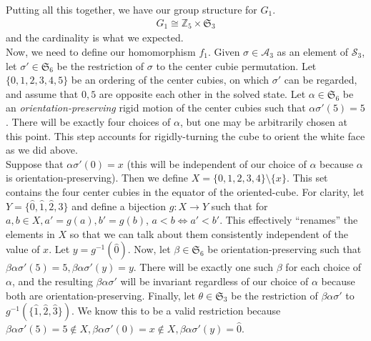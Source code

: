 \documentclass[10pt,letterpaper]{report}
\begin{document}
Putting all this together, we have our group structure for $G_1$. \begin{align*}
G_1 \cong \mathbb{Z}_5 \times \mathfrak{S}_3
\end{align*}
and the cardinality is what we expected.   \\

Now, we need to define our homomorphism $f_1$.  Given $\sigma \in \mathcal{A}_3$ as an element of $\mathcal{S}_3$, let $\sigma' \in \mathfrak{S}_6$ be the restriction of $\sigma$ to the center cubie permutation.  Let $\{0,1,2,3,4,5\}$ be an ordering of the center cubies, on which $\sigma'$ can be regarded, and assume that $0,5$ are opposite each other in the solved state.  Let $\alpha \in \mathfrak{S}_6$ be an \textit{orientation-preserving} rigid motion of the center cubies such that $\alpha \sigma' (5) = 5$.  There will be exactly four choices of $\alpha$, but one may be arbitrarily chosen at this point.  This step accounts for rigidly-turning the cube to orient the white face as we did above. \\

Suppose that $\alpha \sigma' (0) = x$ (this will be independent of our choice of $\alpha$ because $\alpha$ is orientation-preserving).  Then we define $X = \{0,1,2,3,4\} \setminus \{x\}$.  This set contains the four center cubies in the equator of the oriented-cube.  For clarity, let $Y = \{\hat{0},\hat{1},\hat{2},\hat{3}\}$ and define a bijection $g : X \rightarrow Y$ such that for $a,b \in X, a' = g(a), b' = g(b)$, $a < b \Leftrightarrow a' < b'$.  This effectively ``renames'' the elements in $X$ so that we can talk about them consistently independent of the value of $x$.  Let $y = g^{-1}(\hat{0})$.  Now, let $\beta \in \mathfrak{S}_6$ be orientation-preserving such that $\beta \alpha \sigma' (5) = 5, \beta \alpha \sigma' (y) = y$.  There will be exactly one such $\beta$ for each choice of $\alpha$, and the resulting $\beta \alpha \sigma'$ will be invariant regardless of our choice of $\alpha$ because both are orientation-preserving.  Finally, let $\theta \in \mathfrak{S}_3$ be the restriction of $\beta \alpha \sigma'$ to $g^{-1}(\{\hat{1}, \hat{2}, \hat{3}\})$.  We know this to be a valid restriction because $\beta \alpha \sigma' (5) = 5 \notin X, \beta \alpha \sigma' (0) = x \notin X, \beta \alpha \sigma' (y) = \hat{0}$. \\
\end{document}
